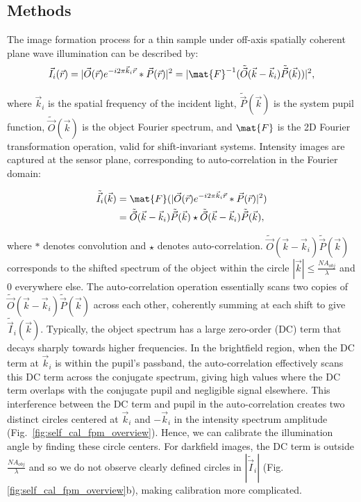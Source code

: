 \subsection{Methods}
The image formation process for a thin sample under off-axis spatially coherent plane wave illumination can be described by:
\begin{equation}
\vec{I}_i(\vec{r}) = |\vec{O}(\vec{r})e^{-i2\pi \vec{k}_i\vec{r}} * \vec{P}(\vec{r})|^2 = |\mat{F}^{-1}(\tilde{\vec{O}}(\vec{k}-\vec{k}_i)\tilde{\vec{P}}(\vec{k}))|^2,
\label{eq:forwardModel}
\end{equation}

\noindent where $\vec{k}_i$ is the spatial frequency of the incident light, $\tilde{\vec{P}}(\vec{k})$ is the system pupil function, $\tilde{\vec{O}}(\vec{k})$ is the object Fourier spectrum, and $\mat{F}$ is the 2D Fourier transformation operation, valid for shift-invariant systems. Intensity images are captured at the sensor plane, corresponding to auto-correlation in the Fourier domain:

\begin{equation}
\begin{split}
\tilde{\vec{I}}_i(\vec{k}) &= \mat{F}(|\vec{O}(\vec{r})e^{-i2\pi \vec{k}_i\vec{r}} * \vec{P}(\vec{r})|^2) \\
&=\tilde{\vec{O}}(\vec{k}-\vec{k}_i)\tilde{\vec{P}}(\vec{k}) \star \tilde{\vec{O}}(\vec{k}-\vec{k}_i)\tilde{\vec{P}}(\vec{k}),
\end{split}
\label{eq:Fourier domain}
\end{equation}

\noindent where $*$ denotes convolution and $\star$ denotes auto-correlation. $\tilde{\vec{O}}(\vec{k}-\vec{k}_i)\tilde{\vec{P}}(\vec{k})$ corresponds to the shifted spectrum of the object within the circle $|\vec{k}| \leq \frac{NA_{obj}}{\lambda}$ and 0 everywhere else. The auto-correlation operation essentially scans two copies of $\tilde{\vec{O}}(\vec{k}-\vec{k}_i)\tilde{\vec{P}}(\vec{k})$ across each other, coherently summing at each shift to give $\tilde{\vec{I}}_i(\vec{k})$. Typically, the object spectrum has a large zero-order (DC) term that decays sharply towards higher frequencies. In the brightfield region, when the DC term at $\vec{k}_i$ is within the pupil's passband, the auto-correlation effectively scans this DC term across the conjugate spectrum, giving high values where the DC term overlaps with the conjugate pupil and negligible signal elsewhere. This interference between the DC term and pupil in the auto-correlation creates two distinct circles centered at $\vec{k}_i$ and $-\vec{k}_i$ in the intensity spectrum amplitude (Fig.~\ref{fig:self_cal_fpm_overview}). Hence, we can calibrate the illumination angle by finding these circle centers. For darkfield images, the DC term is outside $\frac{NA_{obj}}{\lambda}$ and so we do not observe clearly defined circles in $|\tilde{\vec{I}}_i|$ (Fig.\ref{fig:self_cal_fpm_overview}b), making calibration more complicated. 

